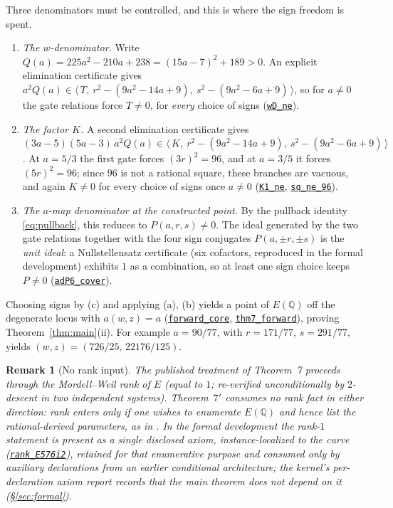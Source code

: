 \documentclass[11pt]{amsart}
\newtheorem{remark}[theorem]{Remark}
\newcommand{\Q}{\mathbb{Q}}
\newcommand{\repourl}{https://github.com/hirokifukui/rd-quartics-classification}
\newcommand{\repotag}{v1.1.0}
\newcommand{\leanline}[3]{\href{\repourl/blob/\repotag/#1\#L#2}{\texttt{#3}}}
\begin{document}
Three denominators must be controlled, and this is where the sign
freedom is spent.
\begin{enumerate}
\item[(a)] \emph{The $w$-denominator.}  Write
$Q(a) = 225a^{2}-210a+238 = (15a-7)^{2}+189 > 0$.  An explicit
elimination certificate gives
$a^{2}Q(a) \in \langle\, T,\ r^{2}-(9a^{2}-14a+9),\
s^{2}-(9a^{2}-6a+9) \,\rangle$, so for $a \neq 0$ the gate relations
force $T \neq 0$, for \emph{every} choice of signs
(\leanline{Thm7Prime/Master.lean}{424}{wD\_ne}).
\item[(b)] \emph{The factor $K$.}  A second elimination certificate
gives
$(3a-5)(5a-3)\,a^{2}Q(a) \in \langle\, K,\
r^{2}-(9a^{2}-14a+9),\ s^{2}-(9a^{2}-6a+9) \,\rangle$.  At $a = 5/3$
the first gate forces $(3r)^{2} = 96$, and at $a = 3/5$ it forces
$(5r)^{2} = 96$; since $96$ is not a rational square, these branches
are vacuous, and again $K \neq 0$ for every choice of signs once
$a \neq 0$ (\leanline{Thm7Prime/Master.lean}{448}{K1\_ne},
\leanline{Thm7Prime/Master.lean}{405}{sq\_ne\_96}).
\item[(c)] \emph{The $a$-map denominator at the constructed point.}
By the pullback identity \eqref{eq:pullback}, this reduces to
$P(a,r,s) \neq 0$.  The ideal generated by the two gate relations
together with the four sign conjugates $P(a,\pm r,\pm s)$ is the
\emph{unit ideal}: a Nullstellensatz certificate (six cofactors,
reproduced in the formal development) exhibits $1$ as a combination,
so at least one sign choice keeps $P \neq 0$
(\leanline{Thm7Prime/Master.lean}{489}{adP6\_cover}).
\end{enumerate}
Choosing signs by (c) and applying (a), (b) yields a point of $E(\Q)$
off the degenerate locus with $a(w,z) = a$
(\leanline{Thm7Prime/Master.lean}{542}{forward\_core},
\leanline{Thm7Prime/Master.lean}{597}{thm7\_forward}), proving
Theorem~\ref{thm:main}(ii).  For example $a = 90/77$, with
$r = 171/77$, $s = 291/77$, yields
$(w,z) = (726/25,\, 22176/125)$.

\begin{remark}[No rank input]\label{rem:norank}
The published treatment of Theorem~7 proceeds through the
Mordell--Weil rank of $E$ (equal to $1$; re-verified unconditionally by
$2$-descent in two independent systems).  Theorem~$7'$ consumes no rank
fact in either direction: rank enters only if one wishes to
\emph{enumerate} $E(\Q)$ and hence list the rational-derived
parameters, as in \cite{BK1995}.  In the formal development the
rank-$1$ statement is present as a single disclosed axiom,
instance-localized to the curve
(\leanline{Thm7Prime/Master.lean}{320}{rank\_E576i2}), retained for
that enumerative purpose and consumed only by auxiliary declarations
from an earlier conditional architecture; the kernel's per-declaration
axiom report records that the main theorem does not depend on it
(\S\ref{sec:formal}).
\end{remark}
\end{document}
